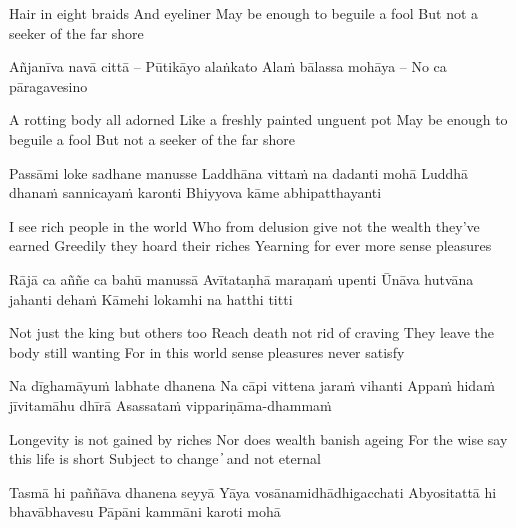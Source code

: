 \begin{english}
Hair in eight braids
And eyeliner
May be enough to beguile a fool
But not a seeker of the far shore
\end{english}

\begin{twochants}
Añjanīva navā cittā – Pūtikāyo alaṅkato
Alaṁ bālassa mohāya – No ca pāragavesino
\end{twochants}

\begin{english}
A rotting body all adorned
Like a freshly painted unguent pot
May be enough to beguile a fool
But not a seeker of the far shore
\end{english}

\begin{twochants}
Passāmi loke sadhane manusse
Laddhāna vittaṁ na dadanti mohā
Luddhā dhanaṁ sannicayaṁ karonti
Bhiyyova kāme abhipatthayanti
\end{twochants}

\begin{english}
I see rich people in the world
Who from delusion give not the wealth they’ve earned
Greedily they hoard their riches
Yearning for ever more sense pleasures
\end{english}

\begin{twochants}
Rājā ca aññe ca bahū manussā
Avītataṇhā maraṇaṁ upenti
Ūnāva hutvāna jahanti dehaṁ
Kāmehi lokamhi na hatthi titti
\end{twochants}

\begin{english}
Not just the king but others too
Reach death not rid of craving
They leave the body still wanting
For in this world sense pleasures never satisfy
\end{english}

\begin{twochants}
Na dīghamāyuṁ labhate dhanena
Na cāpi vittena jaraṁ vihanti
Appaṁ hidaṁ jīvitamāhu dhīrā
Asassataṁ vippariṇāma-dhammaṁ
\end{twochants}

\begin{english}
Longevity is not gained by riches
Nor does wealth banish ageing
For the wise say this life is short
Subject to change  ̓  and not eternal
\end{english}

\begin{twochants}
Tasmā hi paññāva dhanena seyyā
Yāya vosānamidhādhigacchati
Abyositattā hi bhavābhavesu
Pāpāni kammāni karoti mohā
\end{twochants}

